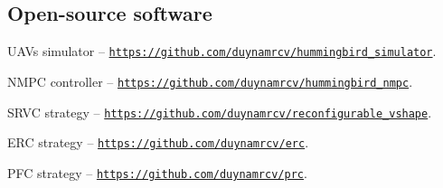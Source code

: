 \subsection*{Open-source software}
UAVs simulator -- {\tt\url{https://github.com/duynamrcv/hummingbird_simulator}}.

NMPC controller -- {\tt\url{https://github.com/duynamrcv/hummingbird_nmpc}}.

SRVC strategy -- {\tt\url{https://github.com/duynamrcv/reconfigurable_vshape}}.

ERC strategy -- {\tt\url{https://github.com/duynamrcv/erc}}.

PFC strategy -- {\tt\url{https://github.com/duynamrcv/prc}}.
